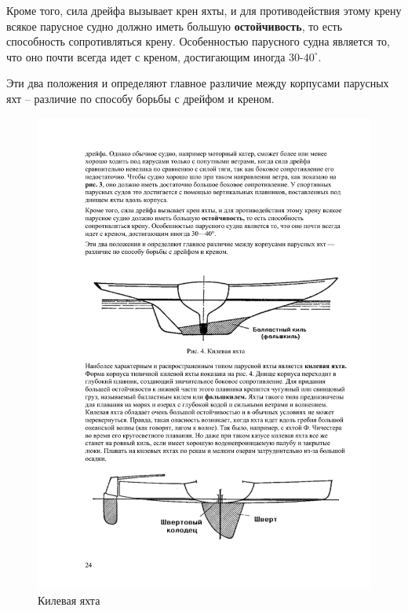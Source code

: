 \documentclass[a4paper, 12pt, twoside, final]{scrbook}
\begin{document}
Кроме того, сила дрейфа вызывает крен яхты, и для противодействия
этому крену всякое парусное судно должно иметь большую \textbf{остойчивость},
то есть способность сопротивляться крену. Особенностью парусного судна
является то, что оно почти всегда идет с креном, достигающим иногда
30\--$40^{\circ}$.

Эти два положения и определяют главное различие между корпусами парусных
яхт \--- различие по способу борьбы с дрейфом и креном.

\begin{figure}[htbp]
\centering\includegraphics[scale=0.9]{Kilevaya_yachta}
\caption{Килевая яхта}
\label{fig:4}
\end{figure}
\end{document}
